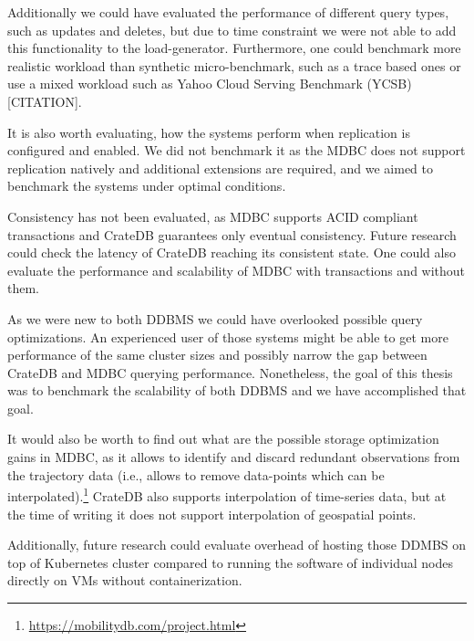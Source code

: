 Additionally we could have evaluated the performance of different query types, such as updates and deletes, but due to time constraint we were not able to add this functionality to the load-generator.
Furthermore, one could benchmark more realistic workload than synthetic micro-benchmark, such as a trace based ones or use a mixed workload such as Yahoo Cloud Serving Benchmark (YCSB) [CITATION].

It is also worth evaluating, how the systems perform when replication is configured and enabled.
We did not benchmark it as the MDBC does not support replication natively and additional extensions are required, and we aimed to benchmark the systems under optimal conditions.

Consistency has not been evaluated, as MDBC supports ACID compliant transactions and CrateDB guarantees only eventual consistency.
Future research could check the latency of CrateDB reaching its consistent state.
One could also evaluate the performance and scalability of MDBC with transactions and without them.

As we were new to both DDBMS we could have overlooked possible query optimizations.
An experienced user of those systems might be able to get more performance of the same cluster sizes and possibly narrow the gap between CrateDB and MDBC querying performance.
Nonetheless, the goal of this thesis was to benchmark the scalability of both DDBMS and we have accomplished that goal.

It would also be worth to find out what are the possible storage optimization gains in MDBC, as it allows to identify and discard redundant observations from the trajectory data 
(i.e., allows to remove data-points which can be interpolated).\footnote{\url{https://mobilitydb.com/project.html}}
CrateDB also supports interpolation of time-series data, but at the time of writing it does not support interpolation of geospatial points.


Additionally, future research could evaluate overhead of hosting those DDMBS on top of Kubernetes cluster compared to running the software of individual nodes directly on VMs without containerization.

